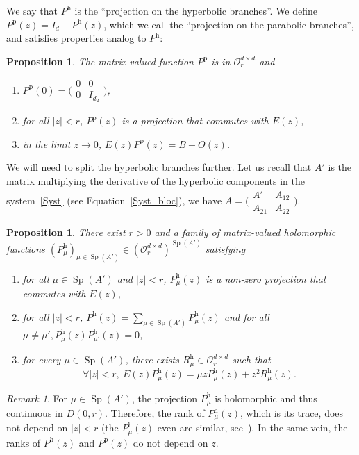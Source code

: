\documentclass[JEP,XML,SOM,Unicode,NoEqCountersInSection]{cedram}
\let\mathcal\mathscr
\theoremstyle{plain}
\newtheorem{prop}[theorem]{Proposition}
\theoremstyle{definition}
\theoremstyle{remark}
\newtheorem{remark}[theorem]{Remark}
\DeclareMathOperator{\Sp}{Sp}
\let\bigO O
\newcommand{\hol}{{\mathcal O}}
\newcommand{\h}{{\mathrm h}}
\newcommand{\p}{{\mathrm p}}
\begin{document}
We say that $P^\h$ is the ``projection on the hyperbolic branches''. We define $P^\p(z) = I_d - P^\h(z)$, which we call the ``projection on the parabolic branches'', and satisfies properties analog to $P^\h$:
\begin{prop}\label{th:perturb_parab}
The matrix-valued function $P^\p$ is in $\hol_{r}^{d\times d}$ and
\begin{enumerate}
\item $P^\p(0) = \big(\begin{smallmatrix}0&0\\0&I_{d_2} \end{smallmatrix} \big)$,
\item for all $|z|<r$, $P^\p(z)$ is a projection that commutes with $E(z)$,
\item in the limit $z\to 0$, $E(z)P^\p(z) = B + \bigO(z)$.
\end{enumerate}
\end{prop}

We will need to split the hyperbolic branches further. Let us recall that $A'$ is the matrix multiplying the derivative of the hyperbolic components in the system~\eqref{Syst} (see Equation~\eqref{Syst_bloc}), \ie we have $A = \big(\begin{smallmatrix}A'&A_{12}\\A_{21}&A_{22}\end{smallmatrix}\big)$.
\begin{prop}\label{th:perturb}
There exist $r>0$ and a family of matrix-valued holomorphic functions $(P_\mu^\h)_{\mu\in\Sp(A')} \in (\hol_{r}^{d\times d})^{\Sp(A')}$ satisfying
\begin{enumerate}
\item
\label{eigenprojection}
for all $\mu \in \Sp(A')$ and $|z|<r$, $P_\mu^\h(z)$ is a non-zero projection that commutes with $E(z)$,
\item
\label{Decompeigenprojection}
for all $|z|<r$, $P^\h(z) = \sum_{\mu \in \Sp(A')} P^\h_\mu(z)$ and for all $\mu\neq \mu', P_\mu^\h(z) P_{\mu'}^\h(z) = 0$,
\item
\label{defAsymHyp}
for every $\mu\in \Sp(A')$, there exists $R_\mu^{\h} \in \mathcal{O}_{r}^{d\times d}$ such that
\begin{equation*}
\forall |z|<r,\ E(z)P_\mu^\h(z) = \mu z P_\mu^\h(z) + z^2R_\mu^\h(z).
\end{equation*}
\end{enumerate}
\end{prop}

\begin{remark}
\label{RmkRk}
For $\mu \in \Sp(A')$, the projection $P_\mu^\h$ is holomorphic and thus continuous in $D(0,r)$. Therefore, the rank of $P_\mu^\h(z)$, which is its trace, does not depend on $|z|<r$ (the $P_\mu^\h(z)$ even are similar, see~\cite[Ch.\,I, \S4.6, Lem.\,4.10]{kato_1995}). In the same vein, the ranks of $P^\h(z)$ and $P^\p(z)$ do not depend on $z$.
\end{remark}
\end{document}
